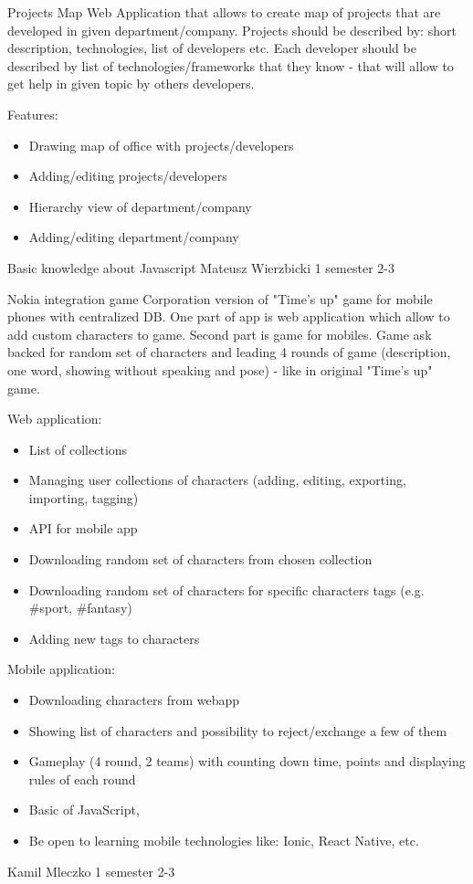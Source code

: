 \begin{project}
{Projects Map}
{Web Application that allows to create map of projects that are developed in given department/company. Projects should be described by: short description, technologies, list of developers etc. Each developer should  be described by list of technologies/frameworks that they know - that will allow to get help in given topic by others developers.} 
{
Features:
\begin{itemize}
	\item Drawing map of office with projects/developers
	\item Adding/editing projects/developers
	\item Hierarchy view of department/company
	\item Adding/editing department/company
\end{itemize}
}
{Basic knowledge about Javascript}
{Mateusz Wierzbicki}
{1 semester}
{2-3}
\end{project}
\begin{project}
{Nokia integration game}
{Corporation version of "Time's up" game for mobile phones with centralized DB. One part of app is web application which allow to add custom characters to game. Second part is game for mobiles. Game ask backed for random set of characters and leading 4 rounds of game (description, one word, showing without speaking and pose) - like in original "Time's up" game.} 
{
Web application:
\begin{itemize}
	\item List of collections
	\item Managing user collections of characters (adding, editing, exporting, importing, tagging)
	\item API for mobile app
	\item Downloading random set of characters from chosen collection
	\item Downloading random set of characters for specific characters tags (e.g. \#sport, \#fantasy)
	\item Adding new tags to characters
\end{itemize}
\bigbreak
Mobile application:
\begin{itemize}
	\item Downloading characters from webapp
	\item Showing list of characters and possibility to reject/exchange a few of them
	\item Gameplay (4 round, 2 teams) with counting down time, points and displaying rules of each round
\end{itemize}
}
{
\begin{itemize}
	\item Basic of JavaScript,
	\item Be open to learning mobile technologies like: Ionic, React Native, etc.
\end{itemize}
}
{Kamil Mleczko}
{1 semester}
{2-3}
\end{project}
